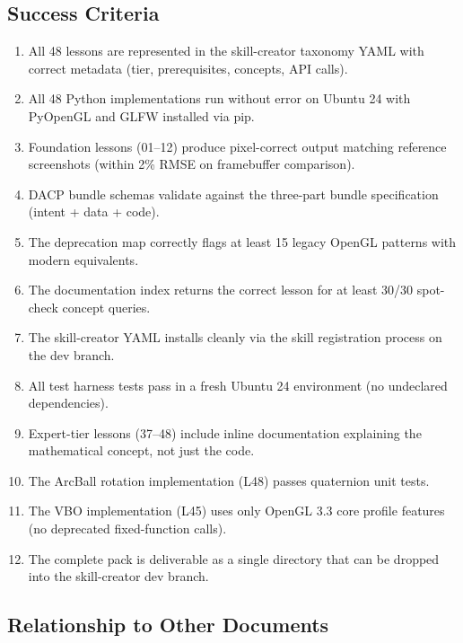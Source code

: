 \documentclass[11pt,letterpaper]{article}
\begin{document}
\subsection{Success Criteria}

\begin{enumerate}
\item All 48 lessons are represented in the skill-creator taxonomy YAML with correct metadata (tier, prerequisites, concepts, API calls).
\item All 48 Python implementations run without error on Ubuntu 24 with PyOpenGL and GLFW installed via pip.
\item Foundation lessons (01--12) produce pixel-correct output matching reference screenshots (within 2\% RMSE on framebuffer comparison).
\item DACP bundle schemas validate against the three-part bundle specification (intent + data + code).
\item The deprecation map correctly flags at least 15 legacy OpenGL patterns with modern equivalents.
\item The documentation index returns the correct lesson for at least 30/30 spot-check concept queries.
\item The skill-creator YAML installs cleanly via the skill registration process on the dev branch.
\item All test harness tests pass in a fresh Ubuntu 24 environment (no undeclared dependencies).
\item Expert-tier lessons (37--48) include inline documentation explaining the mathematical concept, not just the code.
\item The ArcBall rotation implementation (L48) passes quaternion unit tests.
\item The VBO implementation (L45) uses only OpenGL 3.3 core profile features (no deprecated fixed-function calls).
\item The complete pack is deliverable as a single directory that can be dropped into the skill-creator dev branch.
\end{enumerate}

\subsection{Relationship to Other Documents}
\end{document}
